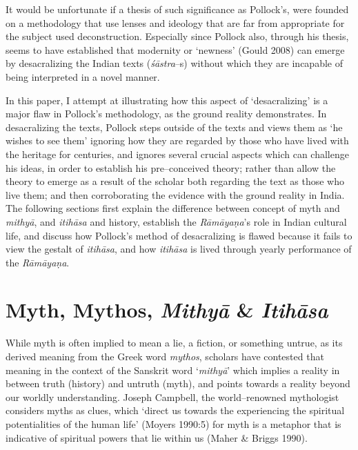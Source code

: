 It would be unfortunate if a thesis of such significance as Pollock’s, were founded on a methodology that use lenses and ideology that are far from appropriate for the subject used deconstruction. Especially since Pollock also, through his thesis, seems to have established that modernity or ‘newness’ (Gould 2008) can emerge by desacralizing the Indian texts (\textit{śāstra}–s) without which they are incapable of being interpreted in a novel manner.

In this paper, I attempt at illustrating how this aspect of ‘desacralizing’ is a major flaw in Pollock’s methodology, as the ground reality demonstrates. In desacralizing the texts, Pollock steps outside of the texts and views them as ‘he wishes to see them’ ignoring how they are regarded by those who have lived with the heritage for centuries, and ignores several crucial aspects which can challenge his ideas, in order to establish his pre–conceived theory; rather than allow the theory to emerge as a result of the scholar both regarding the text as those who live them; and then corroborating the evidence with the ground reality in India. The following sections first explain the difference between concept of myth and \textit{mithyā}, and \textit{itihāsa} and history, establish the \textit{Rāmāyaṇa}’s role in Indian cultural life, and discuss how Pollock’s method of desacralizing is flawed because it fails to view the gestalt of \textit{itihāsa}, and how \textit{itihāsa} is lived through yearly performance of the \textit{Rāmāyaṇa}.


\section*{Myth, Mythos, \textit{Mithyā} \& \textit{Itihāsa}}

While myth is often implied to mean a lie, a fiction, or something untrue, as its derived meaning from the Greek word \textit{mythos}, scholars have contested that meaning in the context of the Sanskrit word ‘\textit{mithyā}’ which implies a reality in between truth (history) and untruth (myth), and points towards a reality beyond our worldly understanding. Joseph Campbell, the world–renowned mythologist considers myths as clues, which ‘direct us towards the experiencing the spiritual potentialities of the human life’ (Moyers 1990:5) for myth is a metaphor that is indicative of spiritual powers that lie within us (Maher \& Briggs 1990).

